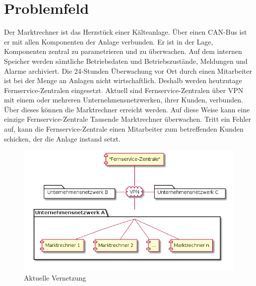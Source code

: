 \documentclass{article}
\begin{document}
\section{Problemfeld}

Der Marktrechner ist das Herzstück einer Kälteanlage. Über einen CAN-Bus ist er mit allen Komponenten der Anlage verbunden. Er ist in der Lage, Komponenten zentral zu parametrieren und zu überwachen. Auf dem internen Speicher werden sämtliche Betriebsdaten und Betriebszustände, Meldungen und Alarme archiviert. Die 24-Stunden Überwachung vor Ort durch einen Mitarbeiter ist bei der Menge an Anlagen nicht wirtschaftlich. Deshalb werden heutzutage Fernservice-Zentralen eingesetzt. Aktuell sind Fernservice-Zentralen über VPN mit einem oder mehreren Unternehmensnetzwerken, ihrer Kunden, verbunden. Über dieses können die Marktrechner erreicht werden. Auf diese Weise kann eine einzige Fernservice-Zentrale Tausende Marktrechner überwachen. Tritt ein Fehler auf, kann die Fernservice-Zentrale einen Mitarbeiter zum betreffenden Kunden schicken, der die Anlage instand setzt.

\begin{figure}[h]
\centering
\includegraphics[scale=0.5]{expose_thesis.png}
\caption{Aktuelle Vernetzung}
\label{fig:current_setup}
\end{figure}
\end{document}

